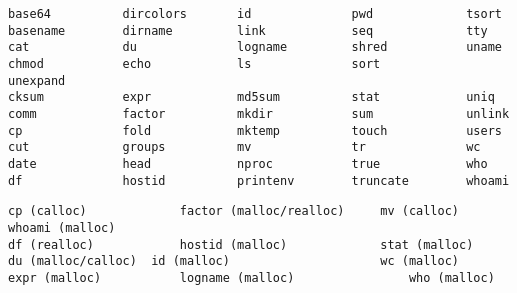 \iffalse
cat ~/ReturnValueTester/test\_dir/utils.txt.bak | egrep -v '^#|^$' | cut -d "|" -f 1 | uniq | sort > utils_used.txt
ls -f -a -1 ~/Downloads/coreutils-8.25/src/*.c | rev | cut -d "/" -f 1 | rev | cut -d "." -f 1 | sort > coreutils.txt 
comm utils_used.txt coreutils.txt -12 | column -c 80
\fi

\begin{minipage}{\linewidth}
\begin{lstlisting}[label={lst:coreutils},caption={GNU Core Utilities tested}]
base64          dircolors       id              pwd             tsort
basename        dirname         link            seq             tty
cat             du              logname         shred           uname
chmod           echo            ls              sort            unexpand
cksum           expr            md5sum          stat            uniq
comm            factor          mkdir           sum             unlink
cp              fold            mktemp          touch           users
cut             groups          mv              tr              wc
date            head            nproc           true            who
df              hostid          printenv        truncate        whoami
\end{lstlisting}
\end{minipage}

\begin{lstlisting}[label={lst:coreutils_crashes},caption={Crashes in GNU Core Utilities}]
cp (calloc)				factor (malloc/realloc)		mv (calloc)       whoami (malloc)
df (realloc)			hostid (malloc)		    	stat (malloc)      
du (malloc/calloc)	id (malloc)						wc (malloc)
expr (malloc)			logname (malloc)				who (malloc)			
\end{lstlisting}